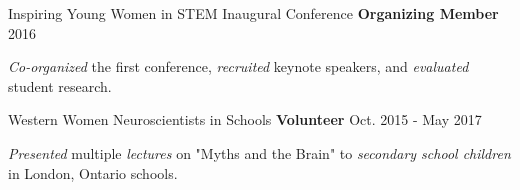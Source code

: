 
\begin{cventries}
    
  \cventry
    {} %
    {Inspiring Young Women in STEM Inaugural Conference}
    {\textbf{Organizing Member}} %
    {2016} %
    {
      \begin{cvitems} %
        \item {\textit{Co-organized} the first conference, \textit{recruited} keynote speakers, and \textit{evaluated} student research.}
      \end{cvitems}
    }
    
  \cventry
    {}
    {Western Women Neuroscientists in Schools}
  	{\textbf{Volunteer}} %
    {Oct. 2015 - May 2017} %
    {
      \begin{cvitems} %
        \item {\textit{Presented} multiple \textit{lectures} on "Myths and the Brain" to \textit{secondary school children} in London, Ontario schools.}
      \end{cvitems}
    }
    
    
\end{cventries}
